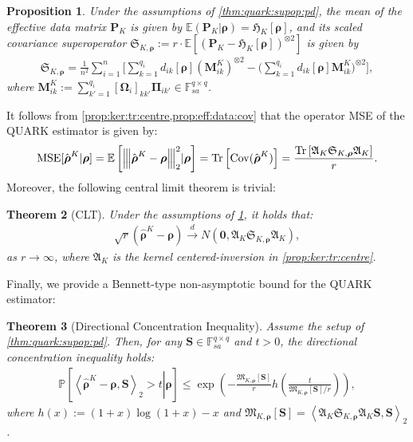\documentclass[noinfoline]{imsart}\setcounter{tocdepth}{2}
\renewcommand{\b}[1]{\mathbb{#1}} %
\newcommand{\m}[1]{\mathbf{#1}} %
\newcommand{\f}[1]{\mathfrak{#1}} %
\newcommand{\mb}[1]{\boldsymbol{#1}} %
\newcommand{\tr}[1]{\operatorname{Tr}\left[#1\right]}
\newcommand{\vertiii}[1]{{\left\vert\kern-0.25ex\left\vert\kern-0.25ex\left\vert #1 
    \right\vert\kern-0.25ex\right\vert\kern-0.25ex\right\vert}} %
\newcommand{\innpr}[2]{{\left\langle {#1},{#2}\right\rangle}} %
\newcommand{\Cov}{\operatorname{Cov}}
\theoremstyle{plain}
\newtheorem{theorem}{Theorem}[section]
\newtheorem{proposition}[theorem]{Proposition}
\begin{document}
\begin{proposition}\label{prop:eff:data:cov}
Under the assumptions of \cref{thm:quark:supop:pd}, the mean of the effective data matrix $\m{P}_{K}$ is given by $\b{E}(\m{P}_{K} \vert \mb{\rho}) = \f{H}_{K} [\mb{\rho}]$, and its \emph{scaled} covariance superoperator $\f{S}_{K, \mb{\rho}} := r \cdot \b{E}[(\m{P}_{K} - \f{H}_{K} [\mb{\rho}])^{\otimes 2}] $
is given by
\begin{align*}
    \f{S}_{K, \mb{\rho}} = \frac{1}{n^{2}} \sum_{i=1}^{n} \Bigg[ \sum_{k=1}^{q_{i}} d_{ik}[\mb{\rho}] (\m{M}_{ik}^{K})^{\otimes 2} - \Big( \sum_{k=1}^{q_{i}} d_{ik}[\mb{\rho}] \m{M}_{ik}^{K} \Big)^{\otimes 2} \Bigg], 
\end{align*}
where $\m{M}_{ik}^{K} := \sum_{k'=1}^{q_i}[\mb{\Omega}_i]_{kk'}\mb{\Pi}_{ik'} \in \b{F}_{sa}^{q \times q}$.
\end{proposition}



It follows from \cref{prop:ker:tr:centre,prop:eff:data:cov} that the operator MSE of the QUARK estimator is given by:
\begin{align*}
    \mathrm{MSE}[\hat{\mb{\rho}}^{K} \vert \mb{\rho}] = \b{E} \left[\vertiii{\hat{\mb{\rho}}^{K} - \mb{\rho}}_{2}^{2} \vert \mb{\rho} \right] = \tr{\Cov(\hat{\mb{\rho}}^{K})} = \frac{\tr{\f{A}_{K} \f{S}_{K, \mb{\rho}} \f{A}_{K}}}{r}.
\end{align*}
Moreover, the following central limit theorem is trivial:
\begin{theorem}[CLT]\label{thm:quark:clt}
Under the assumptions of \cref{prop:eff:data:cov}, it holds that: 
\begin{align*}
    \sqrt{r}(\hat{\mb{\rho}}^{K}-\mb{\rho}) \xrightarrow{d}  N\left(\m{0}, \f{A}_{K} \f{S}_{K, \mb{\rho}} \f{A}_{K} \right),
\end{align*}
as $r\rightarrow\infty$, where $\f{A}_{K}$ is the kernel centered-inversion in \cref{prop:ker:tr:centre}.
\end{theorem}




Finally, we provide a Bennett-type non-asymptotic bound for the QUARK estimator:

\begin{theorem}[Directional Concentration Inequality]\label{thm:innpr:concen}
Assume the setup of \cref{thm:quark:supop:pd}. Then, for any $\m{S} \in \b{F}_{sa}^{q\times q}$ and $t>0$, the directional concentration inequality holds:
\begin{align*}
    \b{P} \left[\left. \innpr{\hat{\mb{\rho}}^{K} - \mb{\rho}}{\m{S}}_{2} >t \right\vert \mb{\rho}\right] \le \exp \left( 
    - \frac{\f M_{K,\mb \rho}[\m S]}{r} h \left( \frac{t}{\f M_{K,\mb \rho}[\m S]/ r} \right) 
    \right),
\end{align*}
where $h(x) := (1+x) \log(1+x) - x$ and $\f M_{K,\mb \rho}[\m S] = \innpr{\f{A}_{K} \f{S}_{K, \mb{\rho}} \f{A}_{K} \m{S}}{\m{S}}_{2}$.
\end{theorem}
\end{document}

